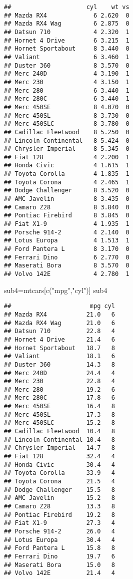 \documentclass[
]{article}
\newenvironment{Shaded}{\begin{snugshade}}{\end{snugshade}}
\newcommand{\FunctionTok}[1]{\textcolor[rgb]{0.00,0.00,0.00}{#1}}
\newcommand{\NormalTok}[1]{#1}
\newcommand{\OtherTok}[1]{\textcolor[rgb]{0.56,0.35,0.01}{#1}}
\newcommand{\StringTok}[1]{\textcolor[rgb]{0.31,0.60,0.02}{#1}}
\begin{document}
\begin{verbatim}
##                     cyl    wt vs
## Mazda RX4             6 2.620  0
## Mazda RX4 Wag         6 2.875  0
## Datsun 710            4 2.320  1
## Hornet 4 Drive        6 3.215  1
## Hornet Sportabout     8 3.440  0
## Valiant               6 3.460  1
## Duster 360            8 3.570  0
## Merc 240D             4 3.190  1
## Merc 230              4 3.150  1
## Merc 280              6 3.440  1
## Merc 280C             6 3.440  1
## Merc 450SE            8 4.070  0
## Merc 450SL            8 3.730  0
## Merc 450SLC           8 3.780  0
## Cadillac Fleetwood    8 5.250  0
## Lincoln Continental   8 5.424  0
## Chrysler Imperial     8 5.345  0
## Fiat 128              4 2.200  1
## Honda Civic           4 1.615  1
## Toyota Corolla        4 1.835  1
## Toyota Corona         4 2.465  1
## Dodge Challenger      8 3.520  0
## AMC Javelin           8 3.435  0
## Camaro Z28            8 3.840  0
## Pontiac Firebird      8 3.845  0
## Fiat X1-9             4 1.935  1
## Porsche 914-2         4 2.140  0
## Lotus Europa          4 1.513  1
## Ford Pantera L        8 3.170  0
## Ferrari Dino          6 2.770  0
## Maserati Bora         8 3.570  0
## Volvo 142E            4 2.780  1
\end{verbatim}

\begin{Shaded}
\begin{Highlighting}[]
\NormalTok{sub4}\OtherTok{=}\NormalTok{mtcars[}\FunctionTok{c}\NormalTok{(}\StringTok{"mpg"}\NormalTok{,}\StringTok{"cyl"}\NormalTok{)]}
\NormalTok{sub4}
\end{Highlighting}
\end{Shaded}

\begin{verbatim}
##                      mpg cyl
## Mazda RX4           21.0   6
## Mazda RX4 Wag       21.0   6
## Datsun 710          22.8   4
## Hornet 4 Drive      21.4   6
## Hornet Sportabout   18.7   8
## Valiant             18.1   6
## Duster 360          14.3   8
## Merc 240D           24.4   4
## Merc 230            22.8   4
## Merc 280            19.2   6
## Merc 280C           17.8   6
## Merc 450SE          16.4   8
## Merc 450SL          17.3   8
## Merc 450SLC         15.2   8
## Cadillac Fleetwood  10.4   8
## Lincoln Continental 10.4   8
## Chrysler Imperial   14.7   8
## Fiat 128            32.4   4
## Honda Civic         30.4   4
## Toyota Corolla      33.9   4
## Toyota Corona       21.5   4
## Dodge Challenger    15.5   8
## AMC Javelin         15.2   8
## Camaro Z28          13.3   8
## Pontiac Firebird    19.2   8
## Fiat X1-9           27.3   4
## Porsche 914-2       26.0   4
## Lotus Europa        30.4   4
## Ford Pantera L      15.8   8
## Ferrari Dino        19.7   6
## Maserati Bora       15.0   8
## Volvo 142E          21.4   4
\end{verbatim}
\end{document}
